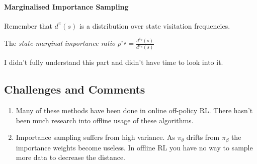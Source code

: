\documentclass{article}
\begin{document}
  \paragraph{Marginalised Importance Sampling} Remember that \(d^{\pi}(s)\) is a distribution over state visitation frequencies.

  The \emph{state-marginal importance ratio} \(\rho^{\pi_{\theta}}= \frac{d^{\pi_{\theta}}(s)}{d^{\pi_{\beta}}(s)} \)


  I didn't fully understand this part and didn't have time to look into it.

\subsection{Challenges and Comments}
\begin{enumerate}
  \item Many of these methods have been done in online off-policy RL. There hasn't been much research into offline usage of these algorithms.
  \item Importance sampling suffers from high variance. As \(\pi_{\theta}\) drifts from \(\pi_{\beta}\) the importance weights become useless. In offline RL you have no way to sample more data to decrease the distance.
\end{enumerate}
\end{document}
